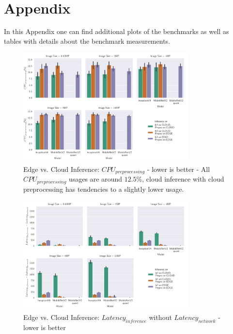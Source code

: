 \appendix
\chapter{Appendix}
In this Appendix one can find additional plots of the benchmarks as well as tables with details about the benchmark measurements.
\begin{figure}[!htb]
\centering
\includegraphics[width=0.8\textwidth]{./Bilder/single_plots/edge_vs_cloud_plots/Edge_vs_Cloud_Inference_Preprocessing_CPU.pdf}
\caption[Edge vs. Cloud Inference: $CPU_{preprocessing}$ - lower is better]{Edge vs. Cloud Inference: $CPU_{preprocessing}$ - lower is better - 
All $CPU_{preprocessing}$ usages are around $12.5\%$, cloud inference with cloud preprocessing has tendencies to a slightly lower usage.}
\label{fig:CloudEdgePreproCPU}
\end{figure}

\begin{figure}[!htb]
\centering
\includegraphics[width=0.8\textwidth]{./Bilder/single_plots/edge_vs_cloud_plots/Edge_vs_Cloud_Inference_Inference_Latencies_WITHOUT_NETWORK.pdf}
\caption{Edge vs. Cloud Inference: $Latency_{inference}$ without $Latency_{network}$ - lower is better}
\label{fig:CloudEdgeInfLatWONetwork}
\end{figure}

